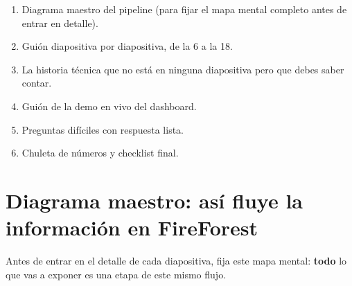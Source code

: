 \documentclass[11pt,a4paper]{article}
\begin{document}
\begin{enumerate}
    \item Diagrama maestro del pipeline (para fijar el mapa mental completo antes de entrar en detalle).
    \item Gui\'on diapositiva por diapositiva, de la 6 a la 18.
    \item La historia t\'ecnica que no est\'a en ninguna diapositiva pero que debes saber contar.
    \item Gui\'on de la demo en vivo del dashboard.
    \item Preguntas dif\'iciles con respuesta lista.
    \item Chuleta de n\'umeros y checklist final.
\end{enumerate}

\newpage
\tableofcontents
\newpage

\section{Diagrama maestro: as\'i fluye la informaci\'on en FireForest}
\label{sec:diagrama_maestro}

Antes de entrar en el detalle de cada diapositiva, fija este mapa mental: \textbf{todo} lo que vas a exponer es una etapa de este mismo flujo.
\end{document}
